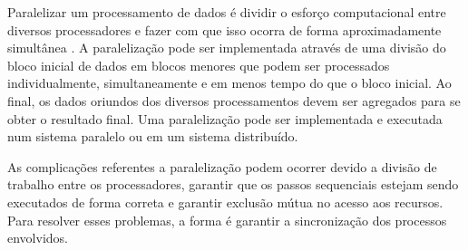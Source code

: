 Paralelizar um processamento de dados é dividir o esforço computacional entre diversos processadores e fazer com que isso ocorra de forma aproximadamente simultânea \citep{chandra2001parallel}. A paralelização pode ser implementada através de uma divisão do bloco inicial de dados em blocos menores que podem ser processados individualmente, simultaneamente e em menos tempo do que o bloco inicial. Ao final, os dados oriundos dos diversos processamentos devem ser agregados para se obter o resultado final. Uma paralelização pode ser implementada e executada num sistema paralelo ou em um sistema distribuído. 

As complicações referentes a paralelização podem ocorrer devido a divisão de trabalho entre os processadores, garantir que os passos sequenciais estejam sendo executados de forma correta e garantir exclusão mútua no acesso aos recursos. Para resolver esses problemas, a forma é garantir a sincronização dos processos envolvidos. 

